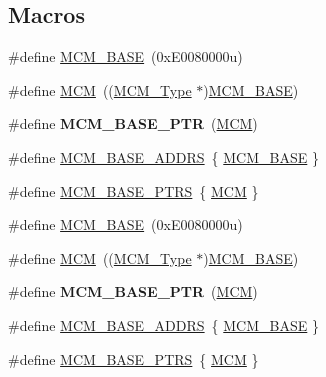 \subsection*{Macros}
\begin{DoxyCompactItemize}
\item 
\#define \hyperlink{group__MCM__Peripheral__Access__Layer_ga84250d5694181f040a437d9125af3fac}{M\+C\+M\+\_\+\+B\+A\+SE}~(0x\+E0080000u)
\item 
\#define \hyperlink{group__MCM__Peripheral__Access__Layer_ga4cd2dcee5e786e36844ed653cfa40096}{M\+CM}~((\hyperlink{structMCM__Type}{M\+C\+M\+\_\+\+Type} $\ast$)\hyperlink{group__MCM__Peripheral__Access__Layer_ga84250d5694181f040a437d9125af3fac}{M\+C\+M\+\_\+\+B\+A\+SE})
\item 
\#define {\bfseries M\+C\+M\+\_\+\+B\+A\+S\+E\+\_\+\+P\+TR}~(\hyperlink{group__MCM__Peripheral__Access__Layer_ga4cd2dcee5e786e36844ed653cfa40096}{M\+CM})\hypertarget{group__MCM__Peripheral__Access__Layer_gad41e931f176c230831e3dbad45117841}{}\label{group__MCM__Peripheral__Access__Layer_gad41e931f176c230831e3dbad45117841}

\item 
\#define \hyperlink{group__MCM__Peripheral__Access__Layer_ga240172b40ddf9d12c884fb331539f5e9}{M\+C\+M\+\_\+\+B\+A\+S\+E\+\_\+\+A\+D\+D\+RS}~\{ \hyperlink{group__MCM__Peripheral__Access__Layer_ga84250d5694181f040a437d9125af3fac}{M\+C\+M\+\_\+\+B\+A\+SE} \}
\item 
\#define \hyperlink{group__MCM__Peripheral__Access__Layer_gae2d5e838ce7d2d4108738c05bf224272}{M\+C\+M\+\_\+\+B\+A\+S\+E\+\_\+\+P\+T\+RS}~\{ \hyperlink{group__MCM__Peripheral__Access__Layer_ga4cd2dcee5e786e36844ed653cfa40096}{M\+CM} \}
\item 
\#define \hyperlink{group__MCM__Peripheral__Access__Layer_ga84250d5694181f040a437d9125af3fac}{M\+C\+M\+\_\+\+B\+A\+SE}~(0x\+E0080000u)
\item 
\#define \hyperlink{group__MCM__Peripheral__Access__Layer_ga4cd2dcee5e786e36844ed653cfa40096}{M\+CM}~((\hyperlink{structMCM__Type}{M\+C\+M\+\_\+\+Type} $\ast$)\hyperlink{group__MCM__Peripheral__Access__Layer_ga84250d5694181f040a437d9125af3fac}{M\+C\+M\+\_\+\+B\+A\+SE})
\item 
\#define {\bfseries M\+C\+M\+\_\+\+B\+A\+S\+E\+\_\+\+P\+TR}~(\hyperlink{group__MCM__Peripheral__Access__Layer_ga4cd2dcee5e786e36844ed653cfa40096}{M\+CM})\hypertarget{group__MCM__Peripheral__Access__Layer_gad41e931f176c230831e3dbad45117841}{}\label{group__MCM__Peripheral__Access__Layer_gad41e931f176c230831e3dbad45117841}

\item 
\#define \hyperlink{group__MCM__Peripheral__Access__Layer_ga240172b40ddf9d12c884fb331539f5e9}{M\+C\+M\+\_\+\+B\+A\+S\+E\+\_\+\+A\+D\+D\+RS}~\{ \hyperlink{group__MCM__Peripheral__Access__Layer_ga84250d5694181f040a437d9125af3fac}{M\+C\+M\+\_\+\+B\+A\+SE} \}
\item 
\#define \hyperlink{group__MCM__Peripheral__Access__Layer_gae2d5e838ce7d2d4108738c05bf224272}{M\+C\+M\+\_\+\+B\+A\+S\+E\+\_\+\+P\+T\+RS}~\{ \hyperlink{group__MCM__Peripheral__Access__Layer_ga4cd2dcee5e786e36844ed653cfa40096}{M\+CM} \}
\end{DoxyCompactItemize}
